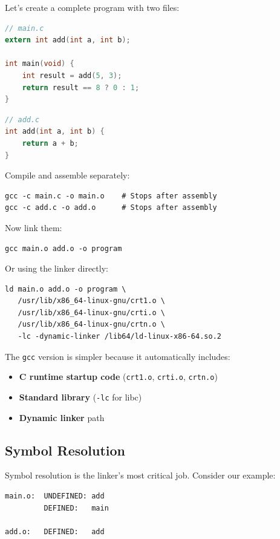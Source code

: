 Let's create a complete program with two files:

\begin{lstlisting}[language=C]
// main.c
extern int add(int a, int b);

int main(void) {
    int result = add(5, 3);
    return result == 8 ? 0 : 1;
}
\end{lstlisting}

\begin{lstlisting}[language=C]
// add.c
int add(int a, int b) {
    return a + b;
}
\end{lstlisting}

Compile and assemble separately:

\begin{verbatim}
gcc -c main.c -o main.o    # Stops after assembly
gcc -c add.c -o add.o      # Stops after assembly
\end{verbatim}

Now link them:

\begin{verbatim}
gcc main.o add.o -o program
\end{verbatim}

Or using the linker directly:

\begin{verbatim}
ld main.o add.o -o program \
   /usr/lib/x86_64-linux-gnu/crt1.o \
   /usr/lib/x86_64-linux-gnu/crti.o \
   /usr/lib/x86_64-linux-gnu/crtn.o \
   -lc -dynamic-linker /lib64/ld-linux-x86-64.so.2
\end{verbatim}

The \texttt{gcc} version is simpler because it automatically includes:
\begin{itemize}
    \item \textbf{C runtime startup code} (\texttt{crt1.o}, \texttt{crti.o}, \texttt{crtn.o})
    \item \textbf{Standard library} (\texttt{-lc} for libc)
    \item \textbf{Dynamic linker} path
\end{itemize}

\subsection{Symbol Resolution}

Symbol resolution is the linker's most critical job. Consider our example:

\begin{verbatim}
main.o:  UNDEFINED: add
         DEFINED:   main

add.o:   DEFINED:   add
\end{verbatim}

